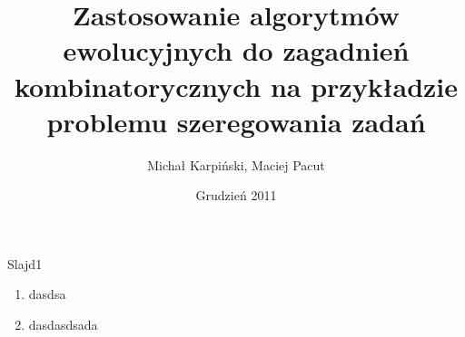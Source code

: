 \documentclass{beamer}
\title{Zastosowanie algorytmów ewolucyjnych do zagadnień kombinatorycznych na przykładzie problemu szeregowania zadań}
\author{Michał Karpiński, Maciej Pacut}
\date{Grudzień 2011}
\begin{document}
\maketitle
 
\begin{frame}{Slajd1}
  \begin{enumerate}
    \item dasdsa
    \item dasdasdsada
  \end{enumerate}
\end{frame}
\end{document}

